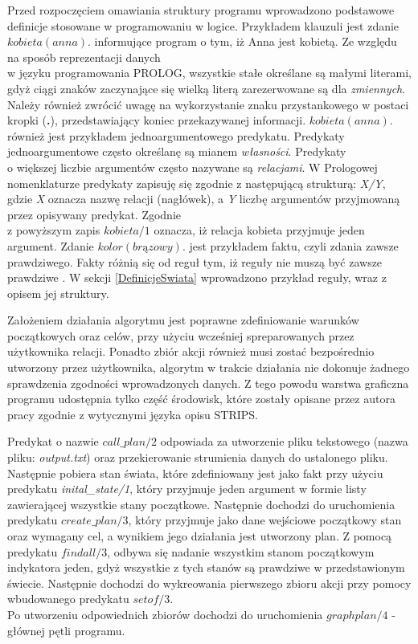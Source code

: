     Przed rozpoczęciem omawiania struktury programu wprowadzono podstawowe definicje stosowane w programowaniu w logice. Przykładem klauzuli jest 
    zdanie $kobieta(anna).$ informujące program o tym, iż Anna jest kobietą. Ze względu na sposób reprezentacji danych \\
    w języku programowania PROLOG, 
    wszystkie stałe określane są małymi literami, gdyż ciągi znaków zaczynające się wielką literą zarezerwowane są dla \textit{zmiennych}. Należy 
    również zwrócić uwagę na wykorzystanie znaku przystankowego w postaci kropki (\textbf{.}), przedstawiający koniec przekazywanej informacji. 
    $kobieta(anna).$ również jest przykładem jednoargumentowego predykatu. Predykaty jednoargumentowe często określanę są mianem \textit{własności}.
    Predykaty \\
    o większej liczbie argumentów często nazywane są \textit{relacjami}. W Prologowej nomenklaturze predykaty zapisuję się zgodnie 
    z następującą strukturą: \textit{X/Y}, gdzie \textit{X} oznacza nazwę relacji (nagłówek), a \textit{Y} liczbę argumentów przyjmowaną przez 
    opisywany predykat. Zgodnie \\
    z powyższym zapis $kobieta/1$ oznacza, iż relacja kobieta przyjmuje jeden argument.
    Zdanie $kolor(brązowy).$ jest przykładem faktu, czyli zdania zawsze prawdziwego. Fakty różnią się od reguł tym, iż reguły nie muszą być zawsze prawdziwe \cite{PROLOG}.
    W sekcji \ref{DefinicjeSwiata} wprowadzono przykład reguły, wraz z opisem jej struktury.

    Założeniem działania algorytmu jest poprawne zdefiniowanie warunków początkowych oraz celów, przy użyciu wcześniej spreparowanych przez użytkownika 
    relacji. Ponadto zbiór akcji również musi zostać bezpośrednio utworzony przez użytkownika, algorytm w trakcie działania nie dokonuje żadnego 
    sprawdzenia zgodności wprowadzonych danych. Z tego powodu warstwa graficzna programu udostępnia tylko część środowisk, które zostały opisane przez 
    autora pracy zgodnie z wytycznymi języka opisu STRIPS.

    Predykat o nazwie $call\_plan/2$ odpowiada za utworzenie pliku tekstowego (nazwa pliku: \textit{output.txt}) oraz przekierowanie strumienia danych 
    do ustalonego pliku. Następnie pobiera stan świata, które zdefiniowany jest jako fakt przy użyciu predykatu \textit{inital\_state/1}, który przyjmuje jeden argument
    w formie listy zawierającej wszystkie stany początkowe. Następnie dochodzi do uruchomienia predykatu $create\_plan/3$, który przyjmuje jako dane
    wejściowe początkowy stan oraz wymagany cel, a wynikiem jego działania jest utworzony plan. Z pomocą predykatu $findall/3$,
    odbywa się nadanie wszystkim stanom początkowym indykatora jeden, gdyż wszystkie z tych stanów są prawdziwe w przedstawionym świecie. 
    Następnie dochodzi do wykreowania pierwszego zbioru akcji przy pomocy wbudowanego predykatu $setof/3$. \\
    Po utworzeniu odpowiednich zbiorów 
    dochodzi do uruchomienia $graphplan/4$ - głównej pętli programu.

